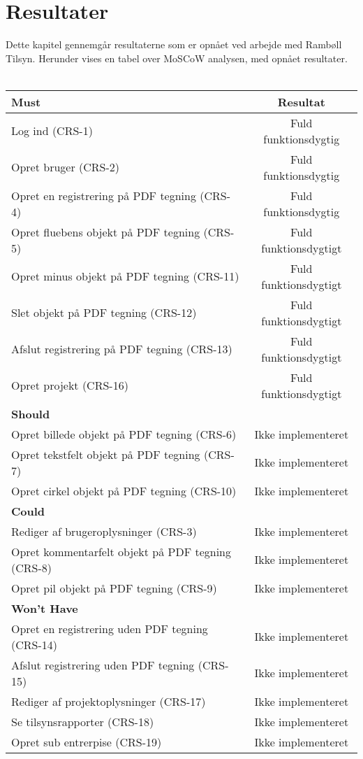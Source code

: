 \chapter{Resultater}
Dette kapitel gennemgår resultaterne som er opnået ved arbejde med Rambøll Tilsyn. Herunder vises en tabel over MoSCoW analysen, med opnået resultater.\\ \\
\begin{tabular}{ l | c  }
	\hline
	\textbf{Must} & \textbf{Resultat} \\ \hline
	Log ind (CRS-1) & Fuld funktionsdygtig \\
	\hline
	Opret bruger (CRS-2) & Fuld funktionsdygtig \\
	\hline
	Opret en registrering på PDF tegning (CRS-4) & Fuld funktionsdygtig\\
	\hline
	Opret fluebens objekt på PDF tegning (CRS-5) & Fuld funktionsdygtigt\\
	\hline
	Opret minus objekt på PDF tegning (CRS-11) & Fuld funktionsdygtigt\\
	\hline
	Slet objekt på PDF tegning (CRS-12) & Fuld funktionsdygtigt\\
	\hline
	Afslut registrering på PDF tegning (CRS-13) & Fuld funktionsdygtigt\\
	\hline
	Opret projekt (CRS-16) & Fuld funktionsdygtigt\\
	\hline
	\hline
	\textbf{Should} &  \\ \hline
	Opret billede objekt på PDF tegning (CRS-6) & Ikke implementeret\\
	\hline
	Opret tekstfelt objekt på PDF tegning (CRS-7) & Ikke implementeret\\
	\hline
	Opret cirkel objekt på PDF tegning (CRS-10) & Ikke implementeret\\
	\hline
	\hline
	\textbf{Could} &  \\ \hline
	Rediger af brugeroplysninger (CRS-3) & Ikke implementeret\\
	\hline
	Opret kommentarfelt objekt på PDF tegning (CRS-8)  & Ikke implementeret\\
	\hline
	Opret pil objekt på PDF tegning (CRS-9) & Ikke implementeret\\
	\hline
	\hline
	\textbf{Won't Have} & \\ \hline
	Opret en registrering uden PDF tegning (CRS-14) & Ikke implementeret\\
	\hline
	Afslut registrering uden PDF tegning (CRS-15) & Ikke implementeret\\
	\hline
	Rediger af projektoplysninger (CRS-17) & Ikke implementeret\\
	\hline
	Se tilsynsrapporter (CRS-18) & Ikke implementeret\\
	\hline
	Opret sub entrerpise (CRS-19) & Ikke implementeret\\
	\hline
\end{tabular} \\


